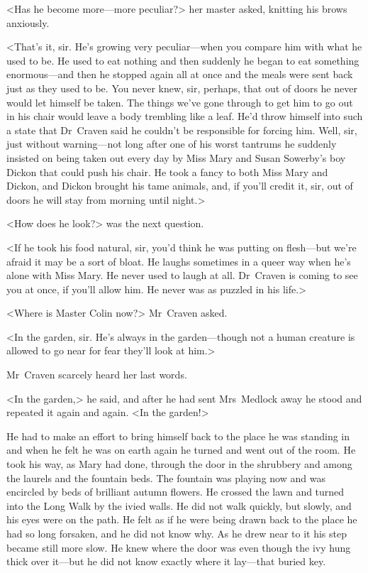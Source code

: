 <Has he become more—more peculiar?> her master asked, knitting his brows anxiously.

<That's it, sir. He's growing very peculiar—when you compare him with what he used to be. He used to eat nothing and then suddenly he began to eat something enormous—and then he stopped again all at once and the meals were sent back just as they used to be. You never knew, sir, perhaps, that out of doors he never would let himself be taken. The things we've gone through to get him to go out in his chair would leave a body trembling like a leaf. He'd throw himself into such a state that Dr~Craven said he couldn't be responsible for forcing him. Well, sir, just without warning—not long after one of his worst tantrums he suddenly insisted on being taken out every day by Miss Mary and Susan Sowerby's boy Dickon that could push his chair. He took a fancy to both Miss Mary and Dickon, and Dickon brought his tame animals, and, if you'll credit it, sir, out of doors he will stay from morning until night.>

<How does he look?> was the next question.

<If he took his food natural, sir, you'd think he was putting on flesh—but we're afraid it may be a sort of bloat. He laughs sometimes in a queer way when he's alone with Miss Mary. He never used to laugh at all. Dr~Craven is coming to see you at once, if you'll allow him. He never was as puzzled in his life.>

<Where is Master Colin now?> Mr~Craven asked.

<In the garden, sir. He's always in the garden—though not a human creature is allowed to go near for fear they'll look at him.>

Mr~Craven scarcely heard her last words.

<In the garden,> he said, and after he had sent Mrs~Medlock away he stood and repeated it again and again. <In the garden!>

He had to make an effort to bring himself back to the place he was standing in and when he felt he was on earth again he turned and went out of the room. He took his way, as Mary had done, through the door in the shrubbery and among the laurels and the fountain beds. The fountain was playing now and was encircled by beds of brilliant autumn flowers. He crossed the lawn and turned into the Long Walk by the ivied walls. He did not walk quickly, but slowly, and his eyes were on the path. He felt as if he were being drawn back to the place he had so long forsaken, and he did not know why. As he drew near to it his step became still more slow. He knew where the door was even though the ivy hung thick over it—but he did not know exactly where it lay—that buried key.

